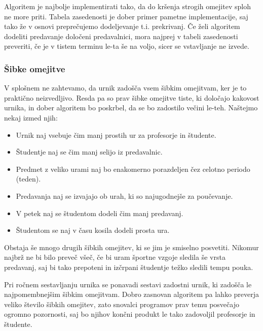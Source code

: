 \documentclass[a4paper,10pt]{article}
\begin{document}
Algoritem je najbolje implementirati tako, da do kršenja strogih omejitev sploh ne more priti.
Tabela zasedenosti je dober primer pametne implementacije, saj tako že v osnovi  preprečujemo
dodeljevanje t.i. prekrivanj. Če želi algoritem dodeliti predavanje določeni predavalnici,
mora najprej v tabeli zasedenosti preveriti, če je v tistem terminu le-ta še na voljo,
sicer se vstavljanje ne izvede.

\subsubsection{Šibke omejitve}

V splošnem ne zahtevamo, da urnik zadošča vsem šibkim omejitvam, ker je to praktično neizvedljivo.
Resda pa so prav šibke omejitve tiste, ki določajo kakovost urnika, in dober algoritem bo
poskrbel, da se bo zadostilo večini le-teh. Naštejmo nekaj izmed njih:

\begin{itemize}
   \item Urnik naj vsebuje čim manj prostih ur za profesorje in študente.
   
   \item Študentje naj se čim manj selijo iz predavalnic.
   
   \item Predmet z veliko urami naj bo enakomerno porazdeljen čez celotno periodo (teden).
   
   \item Predavanja naj se izvajajo ob urah, ki so najugodnejše za poučevanje.
   
   \item V petek naj se študentom dodeli čim manj predavanj.
   
   \item Študentom se naj v času kosila dodeli prosta ura.
\end{itemize}
\noindent
Obstaja še mnogo drugih šibkih omejitev, ki se jim je smiselno posvetiti. Nikomur najbrž ne
bi bilo preveč všeč, če bi uram športne vzgoje sledila še vrsta predavanj, saj bi tako
prepoteni in izčrpani študentje težko sledili tempu pouka.

Pri ročnem sestavljanju urnika se ponavadi sestavi zadostni urnik, ki zadošča le
najpomembnejšim šibkim omejitvam. Dobro zasnovan algoritem pa lahko preverja veliko
število šibkih omejitev, zato snovalci programov prav temu posvečajo ogromno pozornosti,
saj bo njihov končni produkt le tako zadovoljil profesorje in študente.
\end{document}
